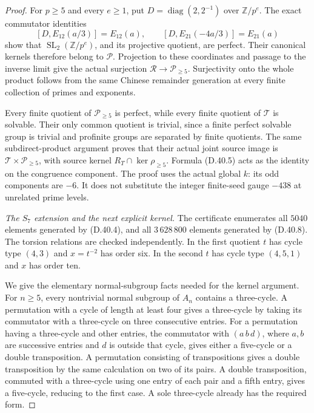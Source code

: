 \begin{proof}
For $p\ge5$ and every $e\ge1$, put
$D=\operatorname{diag}(2,2^{-1})$ over $\mathbb Z/p^e$.
The exact commutator identities
\[
 [D,E_{12}(a/3)]=E_{12}(a),\qquad
 [D,E_{21}(-4a/3)]=E_{21}(a)                            \tag{D.40.15}
\]
show that $\operatorname{SL}_2(\mathbb Z/p^e)$,
and its projective quotient, are perfect. Their
canonical kernels therefore belong to $\mathscr P$.
Projection to these coordinates and passage to
the inverse limit give the actual surjection
$\mathcal R\to\mathcal P_{\ge5}$. Surjectivity
onto the whole product follows from the same
Chinese remainder generation at every finite
collection of primes and exponents.

Every finite quotient of $\mathcal P_{\ge5}$ is
perfect, while every finite quotient of
$\mathcal T$ is solvable. Their only common
quotient is trivial, since a finite perfect
solvable group is trivial and profinite groups
are separated by finite quotients. The same
subdirect-product argument proves that their
actual joint source image is
$\mathcal T\times\mathcal P_{\ge5}$, with source
kernel $R_T\cap\ker\rho_{\ge5}$. Formula (D.40.5)
acts as the identity on the congruence component.
The proof uses the actual global $k$: its odd
components are $-6$. It does not substitute the
integer finite-seed gauge $-438$ at unrelated
prime levels.

\emph{The $S_7$ extension and the next explicit kernel.}
The certificate enumerates all $5040$ elements
generated by (D.40.4), and all $3\,628\,800$
elements generated by (D.40.8). The torsion
relations are checked independently. In the
first quotient $t$ has cycle type $(4,3)$ and
$x=t^{-2}$ has order six. In the second $t$
has cycle type $(4,5,1)$ and $x$ has order ten.

We give the elementary normal-subgroup facts
needed for the kernel argument. For $n\ge5$,
every nontrivial normal subgroup of $A_n$
contains a three-cycle. A permutation with a
cycle of length at least four gives a three-cycle
by taking its commutator with a three-cycle on
three consecutive entries. For a permutation
having a three-cycle and other entries, the
commutator with $(a\,b\,d)$, where $a,b$ are
successive entries and $d$ is outside that cycle,
gives either a five-cycle or a double transposition.
A permutation consisting of transpositions gives
a double transposition by the same calculation
on two of its pairs. A double transposition,
commuted with a three-cycle using one entry of
each pair and a fifth entry, gives a five-cycle,
reducing to the first case. A sole three-cycle
already has the required form.


\end{proof}
